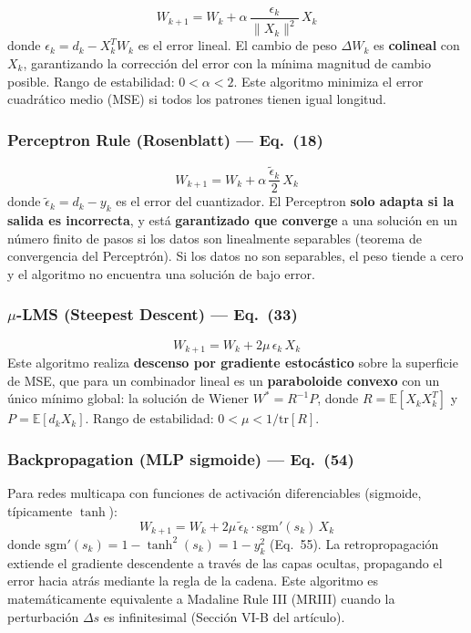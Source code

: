 \documentclass[12pt,a4paper]{article}
\newcommand{\E}{\mathbb{E}}
\newcommand{\norm}[1]{\lVert#1\rVert}
\begin{document}
\[
W_{k+1} = W_k + \alpha\,\frac{\epsilon_k}{\norm{X_k}^2}\,X_k
\]
donde $\epsilon_k = d_k - X_k^T W_k$ es el error lineal. El cambio de peso $\Delta W_k$ es \textbf{colineal} con $X_k$, garantizando la corrección del error con la mínima magnitud de cambio posible. Rango de estabilidad: $0 < \alpha < 2$. Este algoritmo minimiza el error cuadrático medio (MSE) si todos los patrones tienen igual longitud.

\subsubsection{Perceptron Rule (Rosenblatt) — Eq.~(18)}

\[
W_{k+1} = W_k + \alpha\,\frac{\tilde{\epsilon}_k}{2}\,X_k
\]
donde $\tilde{\epsilon}_k = d_k - y_k$ es el error del cuantizador. El Perceptron \textbf{solo adapta si la salida es incorrecta}, y está \textbf{garantizado que converge} a una solución en un número finito de pasos si los datos son linealmente separables (teorema de convergencia del Perceptrón). Si los datos no son separables, el peso tiende a cero y el algoritmo no encuentra una solución de bajo error.

\subsubsection{$\mu$-LMS (Steepest Descent) — Eq.~(33)}

\[
W_{k+1} = W_k + 2\mu\,\epsilon_k\,X_k
\]
Este algoritmo realiza \textbf{descenso por gradiente estocástico} sobre la superficie de MSE, que para un combinador lineal es un \textbf{paraboloide convexo} con un único mínimo global: la solución de Wiener $W^* = R^{-1}P$, donde $R = \E[X_k X_k^T]$ y $P = \E[d_k X_k]$. Rango de estabilidad: $0 < \mu < 1/\mathrm{tr}[R]$.

\subsubsection{Backpropagation (MLP sigmoide) — Eq.~(54)}

Para redes multicapa con funciones de activación diferenciables (sigmoide, típicamente $\tanh$):
\[
W_{k+1} = W_k + 2\mu\,\tilde{\epsilon}_k \cdot \mathrm{sgm}'(s_k)\,X_k
\]
donde $\mathrm{sgm}'(s_k) = 1 - \tanh^2(s_k) = 1 - y_k^2$ (Eq.~55). La retropropagación extiende el gradiente descendente a través de las capas ocultas, propagando el error hacia atrás mediante la regla de la cadena. Este algoritmo es matemáticamente equivalente a Madaline Rule III (MRIII) cuando la perturbación $\Delta s$ es infinitesimal (Sección VI-B del artículo).
\end{document}
